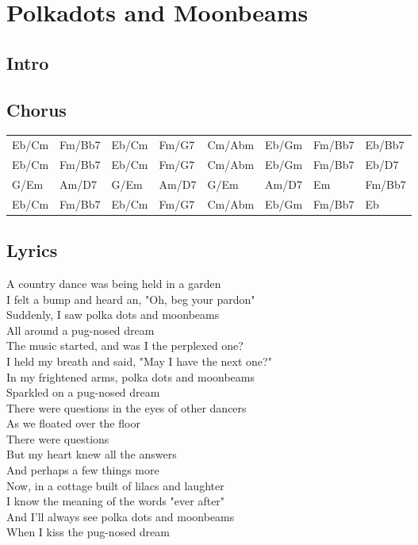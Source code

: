 \section{Polkadots and Moonbeams}


\subsection*{Intro}


\subsection*{Chorus}


\begin{tabular}{l l l l l l l l}
Eb/Cm & Fm/Bb7 & Eb/Cm & Fm/G7 & Cm/Abm & Eb/Gm & Fm/Bb7 & Eb/Bb7 \\ 
Eb/Cm & Fm/Bb7 & Eb/Cm & Fm/G7 & Cm/Abm & Eb/Gm & Fm/Bb7 & Eb/D7 \\ 
G/Em & Am/D7 & G/Em & Am/D7 & G/Em & Am/D7 & Em & Fm/Bb7 \\ 
Eb/Cm & Fm/Bb7 & Eb/Cm & Fm/G7 & Cm/Abm & Eb/Gm & Fm/Bb7 & Eb \\ 
\end{tabular}


\subsection*{Lyrics}


A country dance was being held in a garden \\ 
I felt a bump and heard an, "Oh, beg your pardon" \\ 
Suddenly, I saw polka dots and moonbeams \\ 
All around a pug-nosed dream \\ 
The music started, and was I the perplexed one? \\ 
I held my breath and said, "May I have the next one?" \\ 
In my frightened arms, polka dots and moonbeams \\ 
Sparkled on a pug-nosed dream \\ 
There were questions in the eyes of other dancers \\ 
As we floated over the floor \\ 
There were questions \\ 
But my heart knew all the answers \\ 
And perhaps a few things more \\ 
Now, in a cottage built of lilacs and laughter \\ 
I know the meaning of the words "ever after" \\ 
And I'll always see polka dots and moonbeams \\ 
When I kiss the pug-nosed dream \\ 
